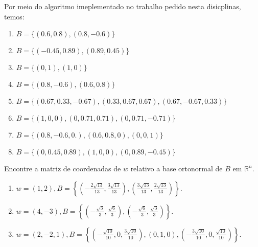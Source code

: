 \begin{resolution}
  Por meio do algoritmo imeplementado no trabalho pedido nesta disicplinas, temos:
  \begin{enumerate}[label=\alph*)]
    \item $B = \{(0.6, 0.8), (0.8, -0.6)\}$
    \item $B = \{(-0.45, 0.89), (0.89, 0.45)\}$
    \item $B = \{(0, 1), (1, 0)\}$
    \item $B = \{(0.8, -0.6), (0.6, 0.8)\}$
    \item $B = \{(0.67, 0.33, -0.67), (0.33, 0.67, 0.67), (0.67, -0.67, 0.33)\}$
    \item $B = \{(1, 0, 0), (0, 0.71, 0.71), (0, 0.71, -0.71)\}$
    \item $B = \{(0.8, -0.6, 0.), (0.6, 0.8, 0), (0, 0, 1)\}$
    \item $B = \{(0, 0.45, 0.89), (1, 0, 0), (0, 0.89, -0.45)\}$
  \end{enumerate}
\end{resolution}

\begin{question}
  Encontre a matriz de coordenadas de $w$ relativo a base ortonormal de $B$ em $\mathbb{R}^{n}$.
  \begin{enumerate}[label=\alph*)]
    \item $w = (1, 2), B = \left\{\left(-\frac{2\sqrt{13}}{13}, \frac{3\sqrt{13}}{13}\right), \left(\frac{3\sqrt{13}}{13}, \frac{2\sqrt{13}}{13}\right)\right\}$.
    \item $w = (4, -3), B = \left\{\left(-\frac{\sqrt{3}}{3}, \frac{\sqrt{6}}{3}\right), \left(-\frac{\sqrt{6}}{3}, \frac{\sqrt{3}}{3}\right)\right\}$.
    \item $w = (2, -2, 1), B = \left\{\left(-\frac{\sqrt{10}}{10}, 0, \frac{3\sqrt{10}}{10}\right), (0, 1, 0), \left(-\frac{3\sqrt{10}}{10}, 0, \frac{\sqrt{10}}{10}\right)\right\}$.
  \end{enumerate}
\end{question}

